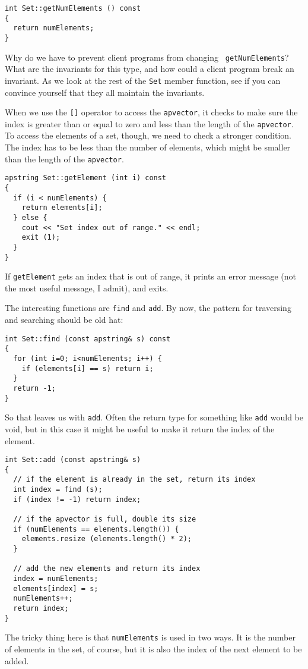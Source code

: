 \begin{verbatim}
int Set::getNumElements () const
{
  return numElements;
}
\end{verbatim}
%
Why do we have to prevent client programs from changing {\tt
getNumElements}?  What are the invariants for this type, and
how could a client program break an invariant.  As we look
at the rest of the {\tt Set} member function, see if you can
convince yourself that they all maintain the invariants.


When we use the {\tt []} operator to access the {\tt apvector},
it checks to make sure the index is greater than or equal to zero
and less than the length of the {\tt apvector}.  To access the
elements of a set, though, we need to check a stronger condition.
The index has to be less than the number of elements, which 
might be smaller than the length of the {\tt apvector}.

\begin{verbatim}
apstring Set::getElement (int i) const
{
  if (i < numElements) {
    return elements[i];
  } else {
    cout << "Set index out of range." << endl;
    exit (1);
  }
}
\end{verbatim}
%
If {\tt getElement} gets an index that is out of range, it prints
an error message (not the most useful message, I admit), and
exits.


The interesting functions are {\tt find} and {\tt add}.  By
now, the pattern for traversing and searching should be old
hat:

\begin{verbatim}
int Set::find (const apstring& s) const
{
  for (int i=0; i<numElements; i++) {
    if (elements[i] == s) return i;
  }
  return -1;
}
\end{verbatim}
%
So that leaves us with {\tt add}.  Often the return type for
something like {\tt add} would be void, but in this case it
might be useful to make it return the index of the element.

\begin{verbatim}
int Set::add (const apstring& s)
{
  // if the element is already in the set, return its index
  int index = find (s);
  if (index != -1) return index;

  // if the apvector is full, double its size
  if (numElements == elements.length()) {
    elements.resize (elements.length() * 2);
  }

  // add the new elements and return its index
  index = numElements;
  elements[index] = s;
  numElements++;
  return index;
}
\end{verbatim}
%
The tricky thing here is that {\tt numElements} is used in
two ways.  It is the number of elements in the set, of course,
but it is also the index of the next element to be added.

